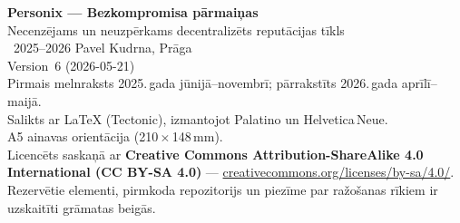 \thispagestyle{empty}
\ifdefined\printmode\vspace*{\fill}\else{}\fi
\begin{flushleft}\small\sffamily
\textbf{Personix --- Bezkompromisa pārmaiņas}\\[0.3em]
Necenzējams un neuzpērkams decentralizēts reputācijas tīkls\\[1.4em]

\textcopyright\ 2025--2026 Pavel Kudrna, Prāga\\[0.4em]

Version~6 (2026-05-21)\\
Pirmais melnraksts 2025.\,gada jūnijā--novembrī; pārrakstīts 2026.\,gada aprīlī--maijā.\\[1.4em]

Salikts ar \LaTeX{} (Tectonic), izmantojot Palatino un Helvetica\,Neue.\\
A5 ainavas orientācija (210\,$\times$\,148\,mm).\\[1.4em]

Licencēts saskaņā ar \textbf{Creative Commons Attribution-ShareAlike 4.0
International (CC BY-SA 4.0)} ---
\href{https://creativecommons.org/licenses/by-sa/4.0/}{creativecommons.org/licenses/by-sa/4.0/}.
Rezervētie elementi, pirmkoda repozitorijs un piezīme par ražošanas rīkiem
ir uzskaitīti grāmatas beigās.
\end{flushleft}
\ifdefined\printmode\else{}\fi
\clearpage
